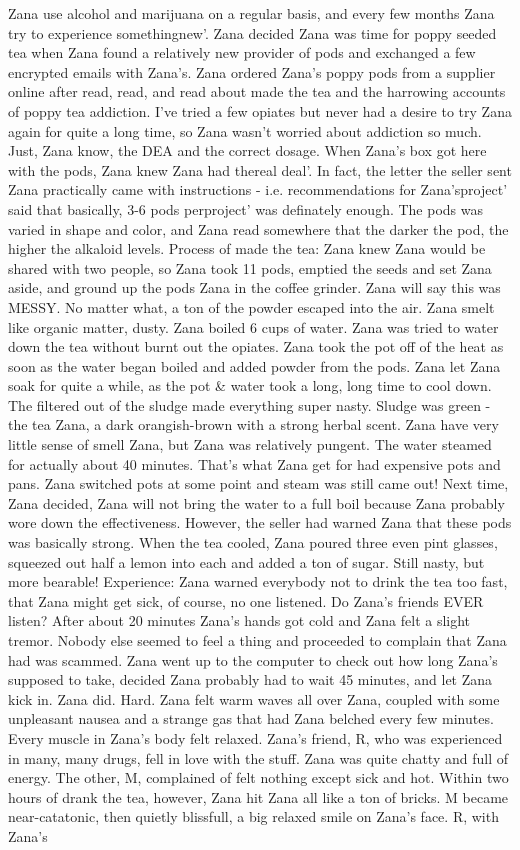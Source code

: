 \documentclass[12pt]{book}
\begin{document}
Zana use alcohol and marijuana on a regular basis, and every few months Zana try to experience somethingnew'. Zana decided Zana was time for poppy seeded tea when Zana found a relatively new provider of pods and exchanged a few encrypted emails with Zana's. Zana ordered Zana's poppy pods from a supplier online after read, read, and read about made the tea and the harrowing accounts of poppy tea addiction. I've tried a few opiates but never had a desire to try Zana again for quite a long time, so Zana wasn't worried about addiction so much. Just, Zana know, the DEA and the correct dosage. When Zana's box got here with the pods, Zana knew Zana had thereal deal'. In fact, the letter the seller sent Zana practically came with instructions - i.e. recommendations for Zana'sproject' said that basically, 3-6 pods perproject' was definately enough. The pods was varied in shape and color, and Zana read somewhere that the darker the pod, the higher the alkaloid levels. Process of made the tea: Zana knew Zana would be shared with two people, so Zana took 11 pods, emptied the seeds and set Zana aside, and ground up the pods Zana in the coffee grinder. Zana will say this was MESSY. No matter what, a ton of the powder escaped into the air. Zana smelt like organic matter, dusty. Zana boiled 6 cups of water. Zana was tried to water down the tea without burnt out the opiates. Zana took the pot off of the heat as soon as the water began boiled and added powder from the pods. Zana let Zana soak for quite a while, as the pot \& water took a long, long time to cool down. The filtered out of the sludge made everything super nasty. Sludge was green - the tea Zana, a dark orangish-brown with a strong herbal scent. Zana have very little sense of smell Zana, but Zana was relatively pungent. The water steamed for actually about 40 minutes. That's what Zana get for had expensive pots and pans. Zana switched pots at some point and steam was still came out! Next time, Zana decided, Zana will not bring the water to a full boil because Zana probably wore down the effectiveness. However, the seller had warned Zana that these pods was basically strong. When the tea cooled, Zana poured three even pint glasses, squeezed out half a lemon into each and added a ton of sugar. Still nasty, but more bearable! Experience: Zana warned everybody not to drink the tea too fast, that Zana might get sick, of course, no one listened. Do Zana's friends EVER listen? After about 20 minutes Zana's hands got cold and Zana felt a slight tremor. Nobody else seemed to feel a thing and proceeded to complain that Zana had was scammed. Zana went up to the computer to check out how long Zana's supposed to take, decided Zana probably had to wait 45 minutes, and let Zana kick in. Zana did. Hard. Zana felt warm waves all over Zana, coupled with some unpleasant nausea and a strange gas that had Zana belched every few minutes. Every muscle in Zana's body felt relaxed. Zana's friend, R, who was experienced in many, many drugs, fell in love with the stuff. Zana was quite chatty and full of energy. The other, M, complained of felt nothing except sick and hot. Within two hours of drank the tea, however, Zana hit Zana all like a ton of bricks. M became near-catatonic, then quietly blissfull, a big relaxed smile on Zana's face. R, with Zana's 
\end{document}
